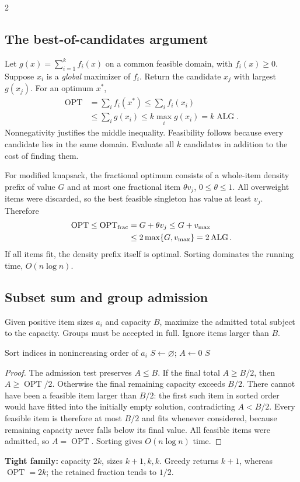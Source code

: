 \documentclass[8pt]{extarticle}
\theoremstyle{definition}
\newcommand{\OPT}{\operatorname{OPT}}
\newcommand{\ALG}{\operatorname{ALG}}
\begin{document}
\begin{multicols*}{2}
\subsection{The best-of-candidates argument}
\label{gre:best}
Let $g(x)=\sum_{i=1}^k f_i(x)$ on a common feasible domain, with $f_i(x)\ge0$.
Suppose $x_i$ is a \emph{global} maximizer of $f_i$. Return the candidate $x_j$ with
largest $g(x_j)$. For an optimum $x^*$,
\[
\begin{aligned}
\OPT&=\sum_i f_i(x^*)\le\sum_i f_i(x_i)\\
&\le\sum_i g(x_i)\le k\max_i g(x_i)=k\ALG.
\end{aligned}
\]
Nonnegativity justifies the middle inequality. Feasibility follows because every candidate
lies in the same domain. Evaluate all $k$ candidates in addition to the cost of finding them.

For modified knapsack, the fractional optimum consists of a whole-item density prefix
of value $G$ and at most one fractional item $\theta v_j$, $0\le\theta\le1$. All overweight
items were discarded, so the best feasible singleton has value at least $v_j$. Therefore
\[
\begin{aligned}
\OPT\le\OPT_{\rm frac}&=G+\theta v_j\le G+v_{\max}\\
&\le2\max\{G,v_{\max}\}=2\ALG.
\end{aligned}
\]
If all items fit, the density prefix itself is optimal. Sorting dominates the running time,
$O(n\log n)$.

\subsection{Subset sum and group admission}
\label{gre:subset}
Given positive item sizes $a_i$ and capacity $B$, maximize the admitted total subject to
the capacity. Groups must be accepted in full. Ignore items larger than $B$.

\begin{algorithm}[H]
\caption{Largest-first admission}
Sort indices in nonincreasing order of $a_i$\;
$S\gets\varnothing$; $A\gets0$\;
\Return $S$\;
\end{algorithm}
\begin{proof}
The admission test preserves $A\le B$. If the final total $A\ge B/2$, then
$A\ge\OPT/2$. Otherwise the final remaining capacity exceeds $B/2$.
There cannot have been a feasible item larger than $B/2$: the first such item in sorted
order would have fitted into the initially empty solution, contradicting $A<B/2$.
Every feasible item is therefore at most $B/2$ and fits whenever considered, because
remaining capacity never falls below its final value. All feasible items were admitted,
so $A=\OPT$. Sorting gives $O(n\log n)$ time.
\end{proof}
\textbf{Tight family:} capacity $2k$, sizes $k+1,k,k$. Greedy returns $k+1$, whereas
$\OPT=2k$; the retained fraction tends to $1/2$.


\end{multicols*}
\end{document}
